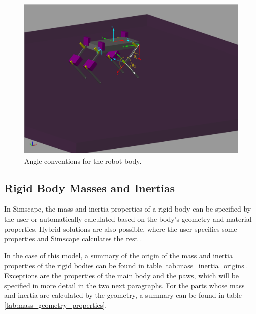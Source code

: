 \begin{figure}
    \centering
    \includegraphics[width=\textwidth]{Images/angle_conventions.png}
    \caption{Angle conventions for the robot body.}
    \label{fig:angle_conventions}
\end{figure}

\subsection{Rigid Body Masses and Inertias}
\label{sec:mass_inertia_properties}

In Simscape, the mass and inertia properties of a rigid body can be specified by the user or automatically calculated based on the body's geometry and material properties. Hybrid solutions are also possible, where the user specifies some properties and Simscape calculates the rest \cite{simscape_tutorial}. 

In the case of this model, a summary of the origin of the mass and inertia properties of the rigid bodies can be found in table \ref{tab:mass_inertia_origins}. Exceptions are the properties of the main body and the paws, which will be specified in more detail in the two next paragraphs. For the parts whose mass and inertia are calculated by the geometry, a summary can be found in table \ref{tab:mass_geometry_properties}. 

